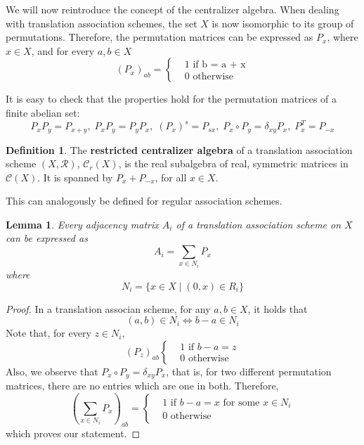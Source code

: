 \documentclass[a4paper,12pt]{article}
\theoremstyle{plain}
\newtheorem{lemma}[theorem]{Lemma}
\theoremstyle{definition}
\newtheorem{definition}[theorem]{Definition}
\theoremstyle{remark}
\begin{document}
We will now reintroduce the concept of the centralizer algebra. When dealing with
translation association schemes, the set $ X $ is now isomorphic to its group
of permutations. Therefore, the permutation matrices can be expressed as $ P_x $,
where $ x \in X $, and for every $ a,b \in X $
\[ (P_x)_{ab} =
    \begin{cases}
        & 1 \text{ if b = a + x} \\
        & 0 \text{ otherwise}
    \end{cases}
\]

It is easy to check that the properties hold for the permutation matrices of
a finite abelian set:
\begin{equation*}
      P_x P_y = P_{x+y},\;
      P_x P_y = P_y P_x,\;
      (P_x)^s = P_{sx},\;
      P_x \circ P_y = \delta_{xy}P_x,\;
      P_x^T = P_{-x}
\end{equation*}

\begin{definition}
    The \textbf{restricted centralizer algebra} of a translation association scheme
    $ (X,\mathcal{R}) $, $ \mathcal{C}_r(X) $, is the real subalgebra of real,
    symmetric matrices in $ \mathcal{C}(X) $.
    It is spanned by $ P_x + P_{-x} $, for all $ x \in X $.
\end{definition}

This can analogously be defined for regular association schemes.

\begin{lemma}
    Every adjacency matrix $ A_i $ of a translation association scheme on $ X $
    can be expressed as
    \[ A_i = \sum_{ x\in N_i } P_x  \]
    where
    \begin{equation}
        N_i = \{ x \in X \mid (0,x) \in R_i \}
    \end{equation}
    \label{lm:Ai_as_sum_of_perm}
\end{lemma}
\begin{proof}
    In a translation associan scheme, for any $ a,b \in X $, it holds that
    \[ (a,b) \in N_i \iff b-a \in N_i \]
    Note that, for every $ z \in N_i $,
    \[ (P_z)_{ab}
        \begin{cases}
            & 1 \text{ if } b-a = z \\
            & 0 \text{ otherwise}
        \end{cases}
    \]
Also, we observe that $ P_x \circ P_y = \delta_{xy} P_x $, that is, for two
different permutation matrices, there are no entries which are one in both.
Therefore,
    \[
        (\sum_{ x \in N_i } P_x)_{ab} =
        \begin{cases}
            & 1 \text{ if } b-a = x \text{ for some } x \in N_i \\
            & 0 \text{ otherwise }
        \end{cases}
    \]
which proves our statement.
\end{proof}
\end{document}
